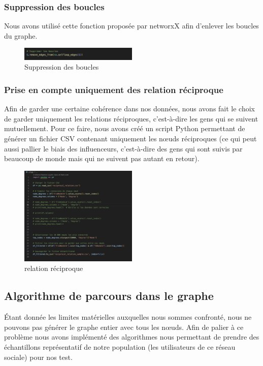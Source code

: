 \documentclass[a4paper, 12pt, twoside]{article}
\begin{document}
    \subsubsection{Suppression des boucles}
    Nous avons utilisé cette fonction proposée par networxX afin d'enlever les boucles du graphe. 

    \begin{figure}[h]
        \centering
        \includegraphics[width=0.5\textwidth]{Supp Boucles.png}
        \caption{Suppression des boucles}
        \label{fig:label_image}
    \end{figure}

    \subsubsection{Prise en compte uniquement des relation réciproque}
    Afin de garder une certaine cohérence dans nos données, nous avons fait le choix de garder uniquement les relations réciproques, c'est-à-dire les gens qui se suivent mutuellement. Pour ce faire, nous avons créé un script Python permettant de générer un fichier CSV contenant uniquement les nœuds réciproques (ce qui peut aussi pallier le biais des influenceurs, c'est-à-dire des gens qui sont suivis par beaucoup de monde mais qui ne suivent pas autant en retour).

        \begin{figure}[h]
            \centering
            \includegraphics[width=0.5\textwidth]{reciproque.png}
            \caption{relation réciproque}
            \label{fig:label_image}
        \end{figure}

\newpage
    \subsection{Algorithme de parcours dans le graphe}
    Étant donnée les limites matérielles auxquelles nous sommes confronté, nous ne pouvons pas générer le graphe entier avec tous les nœuds. Afin de palier à ce problème nous avons implémenté des algorithmes nous permettant de prendre des échantillons représentatif de notre population (les utilisateurs de ce réseau sociale) pour nos test.
\end{document}
